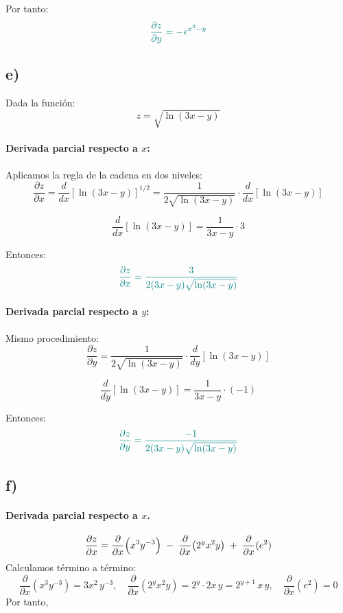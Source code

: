 \documentclass{article}
\begin{document}
Por tanto:
\[
\color{teal}
\frac{\partial z}{\partial y}
= -e^{x^3 - y}
\]

\subsection*{e)}
Dada la función:
\[
z = \sqrt{\ln(3x - y)}
\]

\paragraph{Derivada parcial respecto a \(x\):}

Aplicamos la regla de la cadena en dos niveles:
\[
\frac{\partial z}{\partial x}
= \frac{d}{dx}\left[\ln(3x - y)\right]^{1/2}
= \frac{1}{2\sqrt{\ln(3x - y)}} \cdot \frac{d}{dx}[\ln(3x - y)]
\]

\[
\frac{d}{dx}[\ln(3x - y)] = \frac{1}{3x - y} \cdot 3
\]

Entonces:
\[
\color{teal}
\frac{\partial z}{\partial x}
= \frac{3}{2(3x - y)\sqrt{\ln(3x - y)}}
\]

\paragraph{Derivada parcial respecto a \(y\):}

Mismo procedimiento:
\[
\frac{\partial z}{\partial y}
= \frac{1}{2\sqrt{\ln(3x - y)}} \cdot \frac{d}{dy}[\ln(3x - y)]
\]

\[
\frac{d}{dy}[\ln(3x - y)] = \frac{1}{3x - y} \cdot (-1)
\]

Entonces:
\[
\color{teal}
\frac{\partial z}{\partial y}
= \frac{-1}{2(3x - y)\sqrt{\ln(3x - y)}}
\]



\subsection*{f)}
\paragraph{Derivada parcial respecto a \(x\).}
\[
\frac{\partial z}{\partial x}
= \frac{\partial}{\partial x}\Bigl(x^3 y^{-3}\Bigr)
  \;-\;\frac{\partial}{\partial x}\bigl(2^y x^2 y\bigr)
  \;+\;\frac{\partial}{\partial x}(e^2)
\]
Calculamos término a término:
\[
\frac{\partial}{\partial x}(x^3 y^{-3})
=3x^2\,y^{-3},
\quad
\frac{\partial}{\partial x}(2^y x^2 y)
=2^y\cdot 2x\,y
=2^{y+1}\,x\,y,
\quad
\frac{\partial}{\partial x}(e^2)=0
\]
Por tanto,
\end{document}
